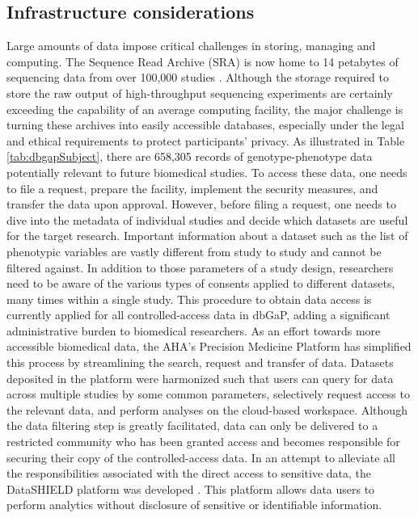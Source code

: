 \documentclass[letter]{bioinfo}
\begin{document}
	
	\subsection*{Infrastructure considerations}
	Large amounts of data impose critical challenges in storing, managing and computing. The Sequence Read Archive (SRA) \citep{Leinonen:2011:Sequence} is now home to 14 petabytes of sequencing data from over 100,000 studies \citep{Langmead:2018:Cloud}.
	Although the storage required to store the raw output of high-throughput sequencing experiments are certainly exceeding the capability of an average computing facility, the major challenge is turning these archives into easily accessible databases, especially under the legal and ethical requirements to protect participants' privacy.
	As illustrated in Table \ref{tab:dbgapSubject}, there are 658,305 records of genotype-phenotype data potentially relevant to future biomedical studies. To access these data, one needs to file a request, prepare the facility, implement the security measures, and transfer the data upon approval. However, before filing a request, one needs to dive into the metadata of individual studies and decide which datasets are useful for the target research. Important information about a dataset such as the list of phenotypic variables are vastly different from study to study and cannot be filtered against. In addition to those parameters of a study design, researchers need to be aware of the various types of consents applied to different datasets, many times within a single study. This procedure to obtain data access is currently applied for all controlled-access data in dbGaP, adding a significant administrative burden to biomedical researchers.
	As an effort towards more accessible biomedical data, the AHA's Precision Medicine Platform \citep{Kass-Hout:2018:American} has simplified this process by streamlining the search, request and transfer of data. Datasets deposited in the platform were harmonized such that users can query for data across multiple studies by some common parameters, selectively request access to the relevant data, and perform analyses on the cloud-based workspace.
	Although the data filtering step is greatly facilitated, data can only be delivered to a restricted community who has been granted access and becomes responsible for securing their copy of the controlled-access data. In an attempt to alleviate all the responsibilities associated with the direct access to sensitive data, the DataSHIELD platform was developed \citep{Gaye:2014:DataSHIELD, Wilson:2017:DataSHIELD}. This platform allows data users to perform analytics without disclosure of sensitive or identifiable information.
\end{document}
